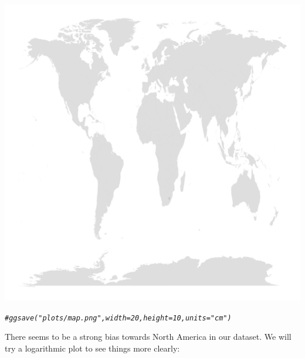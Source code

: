 \documentclass[10pt]{article}\usepackage[]{graphicx}\usepackage[]{color}
\makeatletter
\def\maxwidth{ %
  \ifdim\Gin@nat@width>\linewidth
    \linewidth
  \else
    \Gin@nat@width
  \fi
}
\newcommand{\hlcom}[1]{\textcolor[rgb]{0.678,0.584,0.686}{\textit{#1}}}%
\newenvironment{kframe}{%
 \def\at@end@of@kframe{}%
 \ifinner\ifhmode%
  \def\at@end@of@kframe{\end{minipage}}%
  \begin{minipage}{\columnwidth}%
 \fi\fi%
 \def\FrameCommand##1{\hskip\@totalleftmargin \hskip-\fboxsep
 \colorbox{shadecolor}{##1}\hskip-\fboxsep
     \hskip-\linewidth \hskip-\@totalleftmargin \hskip\columnwidth}%
 \MakeFramed {\advance\hsize-\width
   \@totalleftmargin\z@ \linewidth\hsize
   \@setminipage}}%
 {\par\unskip\endMakeFramed%
 \at@end@of@kframe}
\newenvironment{knitrout}{}{} %
\makeatother
\begin{document}
\begin{knitrout}
\begin{kframe}
{\ttfamily\noindent\color{warningcolor}{\#\# Warning: Computation failed in `stat\_binhex()`:\\\#\# Package `hexbin` required for `stat\_binhex`.\\\#\# Please install and try again.}}\end{kframe}
\includegraphics[width=\maxwidth]{figure/unnamed-chunk-14-1} 
\begin{kframe}\begin{alltt}
\hlcom{#ggsave("plots/map.png", width = 20, height = 10, units = "cm")}
\end{alltt}
\end{kframe}
\end{knitrout}
There seems to be a strong bias towards North America in our dataset. We will try a logarithmic plot to see things more clearly:
\end{document}
